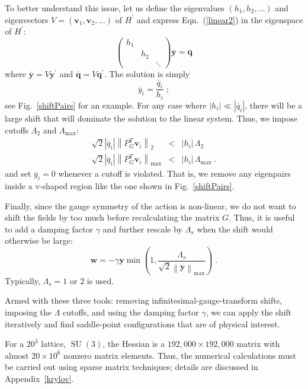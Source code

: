 \documentclass[preprint,aps,prd]{revtex4-2}
\newcommand{\be}{\begin{equation}}
\newcommand{\eq}{\end{equation}}
\newcommand{\heigen}{h}
\DeclareMathOperator{\SU}{SU}
\begin{document}
To better understand this issue, let us define the eigenvalues
$\left(\heigen_1, \heigen_2, \ldots\right)$ and
eigenvectors $V=\left(\mathbf{v}_1, \mathbf{v}_2, \ldots\right)$
of $H^\prime$ and express Eqn.~(\ref{linear2}) in the eigenspace of $H^\prime$:
\be
\begin{pmatrix}
    \heigen_1 & & \\
    & \heigen_2 & \\
    & & \ddots  \end{pmatrix} \overline{\mathbf{y}} =
  \overline{\mathbf{q}} \label{linear3}
\eq
where $\overline{\mathbf{y}} = V \mathbf{y}^\prime$ and
$\overline{\mathbf{q}}  = V \mathbf{q}^\prime$.
The solution is simply
\be
    \overline{y}_i = \frac{\overline{q}_i}{\heigen_i} \; ;
\eq
see Fig.~\ref{shiftPairs} for an example. 
For any case where $\left|\heigen_i\right|\ll \left|\overline{q}_i\right|$,
there will be a large shift that will dominate the solution
to the linear system.
Thus, we impose cutoffs $\Lambda_2$ and $\Lambda_\mathrm{max}$:
\begin{eqnarray}
    \sqrt{2} \left|\overline{q}_i\right|\left\lVert P_G^T \mathbf{v}_i\right\rVert_2
     &<& \left|\heigen_i\right|\,\Lambda_2 \label{lambda2} \\
    \sqrt{2} \left|\overline{q}_i\right|
      \left\lVert P_G^T \mathbf{v}_i\right\rVert_\mathrm{max}
    &<& \left|\heigen_i\right|\,\Lambda_\mathrm{max} \; .
\end{eqnarray}
%
and set $\overline{y}_i=0$ whenever a cutoff is violated.
That is, we remove any eigenpairs inside a v-shaped
region like the one shown in Fig.~\ref{shiftPairs}.  

Finally, since the gauge symmetry of the action is non-linear,
we do not want to shift the fields by too much before recalculating
the matrix $G$.  
Thus, it is useful to add a damping factor $\gamma$ and
further rescale by $\Lambda_s$ when the shift would
otherwise be large:
\be
  \mathbf{w} = - \gamma \mathbf{y} \min\left(1, \frac{\Lambda_s}{
    \sqrt{2} \left\lVert \mathbf{y}\right\rVert_\mathrm{max}}\right) \; .
\eq
Typically, $\Lambda_s = 1$ or $2$ is used.

Armed with these three tools:  removing infinitesimal-gauge-transform shifts,
imposing the $\Lambda$ cutoffs, and using the damping factor $\gamma$,
we can apply the shift iteratively and find saddle-point configurations
that are of physical interest.

For a $20^3$ lattice, $\SU(3)$, the Hessian is a
$192,000 \times 192,000$ matrix with almost $20\times 10^6$
nonzero matrix elements. Thus, the numerical calculations
must be carried out using sparse matrix techniques;
details are discussed in Appendix~\ref{krylov}.
\end{document}
